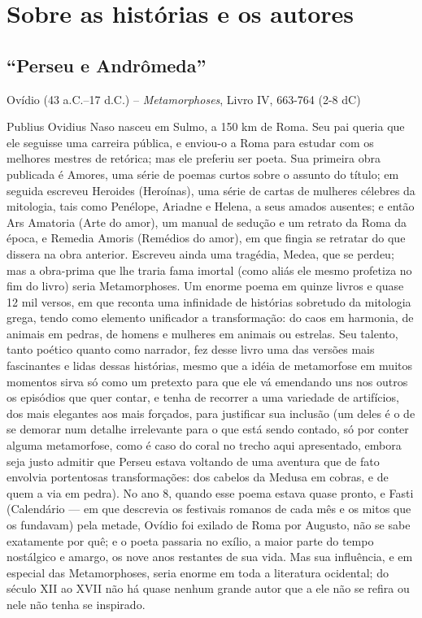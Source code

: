 
\chapter{Sobre as histórias e os autores}

\section{“Perseu e Andrômeda”}

Ovídio (43 a.C.--17 d.C.) -- \textit{Metamorphoses}, Livro IV, 663-764 (2-8 dC)

Publius Ovidius Naso nasceu em Sulmo, a 150 km de Roma. Seu pai queria
que ele seguisse uma carreira pública, e enviou-o a Roma para estudar
com os melhores mestres de retórica; mas ele preferiu ser poeta. Sua
primeira obra publicada é Amores, uma série de poemas curtos sobre o
assunto do título; em seguida escreveu Heroides (Heroínas), uma série
de cartas de mulheres célebres da mitologia, tais como Penélope,
Ariadne e Helena, a seus amados ausentes; e então Ars Amatoria (Arte
do amor), um manual de sedução e um retrato da Roma da época, e
Remedia Amoris (Remédios do amor), em que fingia se retratar do que
dissera na obra anterior. Escreveu ainda uma tragédia, Medea, que se
perdeu; mas a obra-prima que lhe traria fama imortal (como aliás ele
mesmo profetiza no fim do livro) seria Metamorphoses. Um enorme poema
em quinze livros e quase 12 mil versos, em que reconta uma infinidade
de histórias sobretudo da mitologia grega, tendo como elemento
unificador a transformação: do caos em harmonia, de animais em
pedras, de homens e mulheres em animais ou estrelas. Seu talento,
tanto poético quanto como narrador, fez desse livro uma das versões
mais fascinantes e lidas dessas histórias, mesmo que a idéia de
metamorfose em muitos momentos sirva só como um pretexto para que ele
vá emendando uns nos outros os episódios que quer contar, e tenha de
recorrer a uma variedade de artifícios, dos mais elegantes aos mais
forçados, para justificar sua inclusão (um deles é o de se demorar
num detalhe irrelevante para o que está sendo contado, só por conter
alguma metamorfose, como é caso do coral no trecho aqui apresentado,
embora seja justo admitir que Perseu estava voltando de uma aventura
que de fato envolvia portentosas transformações: dos cabelos da
Medusa em cobras, e de quem a via em pedra). No ano 8, quando esse
poema estava quase pronto, e Fasti (Calendário — em que descrevia os
festivais romanos de cada mês e os mitos que os fundavam) pela
metade, Ovídio foi exilado de Roma por Augusto, não se sabe
exatamente por quê; e o poeta passaria no exílio, a maior parte do
tempo nostálgico e amargo, os nove anos restantes de sua vida. Mas
sua influência, e em especial das Metamorphoses, seria enorme em toda
a literatura ocidental; do século XII ao XVII não há quase nenhum
grande autor que a ele não se refira ou nele não tenha se inspirado. 


